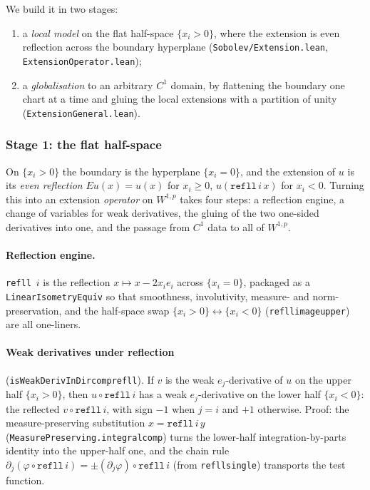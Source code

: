 ﻿\documentclass[12pt, a4paper]{article}
\renewcommand{\_}{\origunderscore\allowbreak}
\theoremstyle{definition}
\theoremstyle{plain}
\begin{document}
We build it in two stages:
\begin{enumerate}
  \item a \emph{local model} on the flat half-space $\{x_i>0\}$, where the extension is even
    reflection across the boundary hyperplane (\texttt{Sobolev/\allowbreak Extension.\allowbreak lean},
    \texttt{ExtensionOperator.\allowbreak lean});
  \item a \emph{globalisation} to an arbitrary $C^1$ domain, by flattening the boundary one chart at a
    time and gluing the local extensions with a partition of unity
    (\texttt{Extension\allowbreak General.\allowbreak lean}).
\end{enumerate}

\subsubsection*{Stage 1: the flat half-space}

On $\{x_i>0\}$ the boundary is the hyperplane $\{x_i=0\}$, and the extension of $u$ is its
\emph{even reflection} $Eu(x)=u(x)$ for $x_i\ge0$, $u(\texttt{refll}\,i\,x)$ for $x_i<0$.  Turning
this into an extension \emph{operator} on $W^{1,p}$ takes four steps: a reflection engine, a change of
variables for weak derivatives, the gluing of the two one-sided derivatives into one, and the passage
from $C^1$ data to all of $W^{1,p}$.

\paragraph{Reflection engine.}  \texttt{refll}~$i$ is the reflection $x\mapsto x-2x_i e_i$ across
$\{x_i=0\}$, packaged as a \texttt{LinearIsometryEquiv} so that smoothness, involutivity, measure-
and norm-preservation, and the half-space swap $\{x_i>0\}\leftrightarrow\{x_i<0\}$
(\texttt{refll\_image\_upper}) are all one-liners.

\paragraph{Weak derivatives under reflection} (\texttt{isWeakDerivInDir\_comp\_refll}).  If $v$ is
the weak $e_j$-derivative of $u$ on the upper half $\{x_i>0\}$, then $u\circ\texttt{refll}\,i$ has a
weak $e_j$-derivative on the lower half $\{x_i<0\}$: the reflected $v\circ\texttt{refll}\,i$, with sign
$-1$ when $j=i$ and $+1$ otherwise.  Proof: the measure-preserving substitution $x=\texttt{refll}\,i\,y$
(\texttt{MeasurePreserving.integral\_comp}) turns the lower-half integration-by-parts identity into the
upper-half one, and the chain rule $\partial_j(\varphi\circ\texttt{refll}\,i)=\pm(\partial_j\varphi)
\circ\texttt{refll}\,i$ (from \texttt{refll\_single}) transports the test function.
\end{document}
